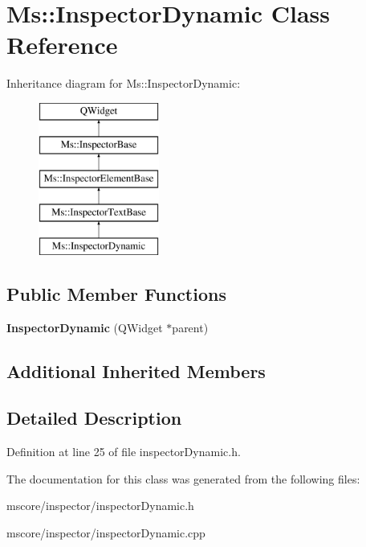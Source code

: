 \hypertarget{class_ms_1_1_inspector_dynamic}{}\section{Ms\+:\+:Inspector\+Dynamic Class Reference}
\label{class_ms_1_1_inspector_dynamic}
Inheritance diagram for Ms\+:\+:Inspector\+Dynamic\+:\begin{figure}[H]
\begin{center}
\leavevmode
\includegraphics[height=5.000000cm]{class_ms_1_1_inspector_dynamic}
\end{center}
\end{figure}
\subsection*{Public Member Functions}
\begin{DoxyCompactItemize}
\item 
\mbox{\label{class_ms_1_1_inspector_dynamic_a307f8a90653a4087f70ee987c86b73fe}} 
{\bfseries Inspector\+Dynamic} (Q\+Widget $\ast$parent)
\end{DoxyCompactItemize}
\subsection*{Additional Inherited Members}


\subsection{Detailed Description}


Definition at line 25 of file inspector\+Dynamic.\+h.



The documentation for this class was generated from the following files\+:\begin{DoxyCompactItemize}
\item 
mscore/inspector/inspector\+Dynamic.\+h\item 
mscore/inspector/inspector\+Dynamic.\+cpp\end{DoxyCompactItemize}
